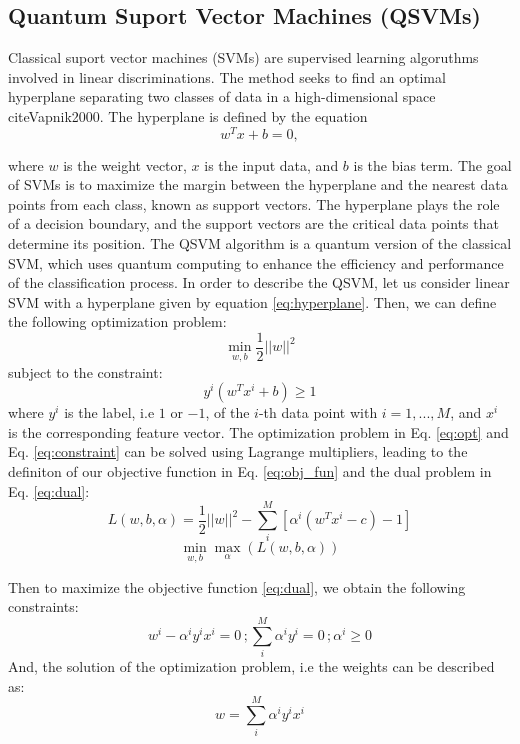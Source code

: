 \documentclass{article}
\begin{document}
\subsection*{Quantum Suport Vector Machines (QSVMs)}

Classical suport vector machines (SVMs) are supervised learning algoruthms involved in linear discriminations. The method seeks to find an optimal hyperplane separating two classes of data in a high-dimensional space cite{Vapnik2000}. The hyperplane is defined by the equation 
\begin{equation}
  w^T x + b = 0,
  \label{eq:hyperplane}
\end{equation}

where $w$ is the weight vector, $x$ is the input data, and $b$ is the bias term. The goal of SVMs is to maximize the margin between the hyperplane and the nearest data points from each class, known as support vectors. The hyperplane plays the role of a decision boundary, and the support vectors are the critical data points that determine its position. The QSVM algorithm is a quantum version of the classical SVM, which uses quantum computing to enhance the efficiency and performance of the classification process. In order to describe the QSVM, let us consider linear SVM with a hyperplane given by equation \ref{eq:hyperplane}. Then, we can define the following optimization problem:
\begin{equation}
  \min_{w,b} \frac{1}{2} ||w||^2
  \label{eq:opt}
\end{equation}
subject to the constraint:
\begin{equation}
  y^{i} (w^T x^i + b) \geq 1
  \label{eq:constraint}
\end{equation}
where $y^i$ is the label, i.e $1$ or $-1$, of the $i$-th data point with $i = {1, ...,M}$, and $x^i$ is the corresponding feature vector. The optimization problem in Eq. \ref{eq:opt} and Eq. \ref{eq:constraint} can be solved using Lagrange multipliers, leading to the definiton of our objective function in Eq. \ref{eq:obj_fun} and the dual problem in Eq. \ref{eq:dual}: 
\begin{equation}
  L(w, b, \alpha)=\frac{1}{2}||w||^2 - \sum_{i}^{M} [\alpha^{i}(w^T x^{i} - c)-1]
  \label{eq:obj_fun}
\end{equation}
\begin{equation}
    \min_{w,b}\max_{\alpha}(L(w, b, \alpha)) 
  \label{eq:dual}
\end{equation}

Then to maximize the objective function \ref{eq:dual}, we obtain the following constraints:
\begin{equation}
  w^{i} - \alpha^{i} y^{i} x^{i} = 0 \, ; \sum_{i}^{M} \alpha^{i} y^{i} = 0 \, ; \alpha^{i} \geq 0
  \label{eq:constraints}
\end{equation}
And, the solution of the optimization problem, i.e the weights can be described as:
\begin{equation}
  w = \sum_{i}^{M} \alpha^{i} y^{i} x^{i}
  \label{eq:solution}
\end{equation}
\end{document}
